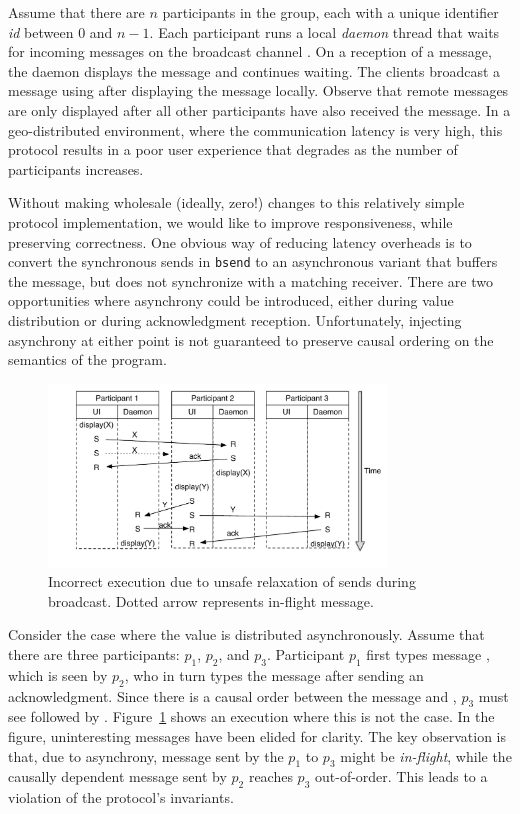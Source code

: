 Assume that there are $n$ participants in the group, each with a unique
identifier \emph{id} between $0$ and $n-1$. Each participant runs a local
\emph{daemon} thread that waits for incoming messages on the broadcast channel
. On a reception of a message, the daemon displays the message and
continues waiting. The clients broadcast a message using  after
displaying the message locally.  Observe that remote messages are only
displayed after all other participants have also received the message. In a
geo-distributed environment, where the communication latency is very high, this
protocol results in a poor user experience that degrades as the number of
participants increases.

Without making wholesale (ideally, zero!) changes to this relatively simple
protocol implementation, we would like to improve responsiveness, while
preserving correctness.  One obvious way of reducing latency overheads is to
convert the synchronous sends in {\tt bsend} to an asynchronous variant that
buffers the message, but does not synchronize with a matching receiver. There
are two opportunities where asynchrony could be introduced, either during value
distribution or during acknowledgment reception. Unfortunately, injecting
asynchrony at either point is not guaranteed to preserve causal ordering on the
semantics of the program.

\begin{figure}[t]
\begin{centering}
	\includegraphics[width=0.8\textwidth] {Figures/ChatServer_AsyncValue}
	\caption{Incorrect execution due to unsafe relaxation of sends during
	broadcast. Dotted arrow represents in-flight message.}
	\label{fig:CS_asend_value}
\end{centering}
\end{figure}

Consider the case where the value is distributed asynchronously. Assume that
there are three participants: $p_1$, $p_2$, and $p_3$. Participant $p_1$ first
types message , which is seen by $p_2$, who in turn types the message
 after sending an acknowledgment. Since there is a causal order between
the message  and , $p_3$ must see  followed by
. Figure~\ref{fig:CS_asend_value} shows an execution where this is
not the case. In the figure, uninteresting messages have been elided for
clarity. The key observation is that, due to asynchrony, message  sent
by the $p_1$ to $p_3$ might be \emph{in-flight}, while the causally dependent
message  sent by $p_2$ reaches $p_3$ out-of-order. This leads to a
violation of the protocol's invariants.

